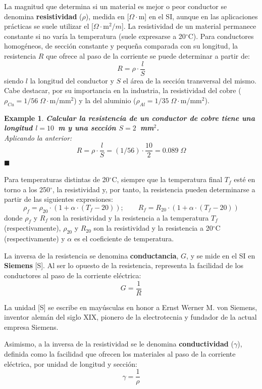 \documentclass[11pt]{book} %
\numberwithin{dummy}{section}
\theoremstyle{ocrenumbox}
\theoremstyle{blacknumex}
\newtheorem{exampleT}{Example}[chapter]
\theoremstyle{blacknumbox}
\theoremstyle{ocrenum}
\newenvironment{example}{\begin{exampleT}}{\hfill{\tiny\ensuremath{\blacksquare}}\end{exampleT}}
\newenvironment{remark}{\par\vspace{10pt}\small %
\begin{list}{}{
\leftmargin=35pt %
\rightmargin=25pt}\item\ignorespaces %
\makebox[-2.5pt]{\begin{tikzpicture}[overlay]
\node[draw=ocre!60,line width=1pt,circle,fill=ocre!25,font=\sffamily\bfseries,inner sep=2pt,outer sep=0pt] at (-15pt,0pt){\textcolor{ocre}{N}};\end{tikzpicture}} %
\advance\baselineskip -1pt}{\end{list}\vskip5pt} %
\newlength\esp
\begin{document}
	La magnitud que determina si un material es mejor o peor conductor se denomina \textbf{resistividad} ($\rho$), medida en [$\Omega\cdot$m] en el SI, aunque en las aplicaciones prácticas se suele utilizar el [$\Omega\cdot$m$^2/m$]. La resistividad de un material permanece constante si no varía la temperatura (suele expresarse a 20$^\circ$C). Para conductores homogéneos, de sección constante y pequeña comparada con su longitud, la resistencia $R$ que ofrece al paso de la corriente se puede determinar a partir de: 
	\begin{equation*}\label{eq.resistencia_rho}
		R=\rho\cdot \dfrac{l}{S}
	\end{equation*}
	siendo $l$ la longitud del conductor y $S$ el área de la sección transversal del mismo. Cabe destacar, por su importancia en la industria, la resistividad del cobre ($\rho_{Cu}=1/56\;\Omega \cdot$m/mm$^2$) y la del aluminio ($\rho_{Al}=1/35\;\Omega \cdot$m/mm$^2$).
	
	\vspace{4mm}
	\begin{example}
		\textbf{Calcular la resistencia de un conductor de cobre tiene una longitud $l=10$~m y una sección $S=2$~mm$^2$.}\\
		Aplicando la anterior: 
		\begin{equation*}
			R=\rho\cdot \dfrac{l}{S}=(1/56)\cdot \dfrac{10}{2}=0.089\;\Omega
		\end{equation*}
	\end{example}
	
	Para temperaturas distintas de 20$^\circ$C, siempre que la temperatura final $T_f$ esté en torno a los 250$^\circ$, la resistividad y, por tanto, la resistencia pueden determinarse a partir de las siguientes expresiones:
	\begin{equation*}
		\rho_f=\rho_{20}\cdot (1+\alpha\cdot (T_f-20)); \qquad
		R_f=R_{20}\cdot (1+\alpha\cdot (T_f-20))
	\end{equation*}
	donde $\rho_f$ y $R_f$ son la resistividad y la resistencia a la temperatura $T_f$ (respectivamente), $\rho_{20}$ y $R_{20}$ son la resistividad y la resistencia a 20$^\circ$C (respectivamente) y $\alpha$ es el coeficiente de temperatura. 
	
	La inversa de la resistencia se denomina \textbf{conductancia}, $G$, y se mide en el SI en \textbf{Siemens} [S]. Al ser lo opuesto de la resistencia, representa la facilidad de los conductores al paso de la corriente eléctrica:
	\begin{equation}
		\boxed{G=\dfrac{1}{R}}
	\end{equation}
	\begin{remark}
		La unidad [S] se escribe en mayúsculas en honor a Ernst Werner M. von Siemens, inventor alemán del siglo XIX, pionero de la electrotecnia y fundador de la actual empresa Siemens.
	\end{remark}
	Asimismo, a la inversa de la resistividad se le denomina \textbf{conductividad} ($\gamma$), definida como la facilidad que ofrecen los materiales al paso de la corriente eléctrica, por unidad de longitud y sección:
	\begin{equation*}
		\gamma=\dfrac{1}{\rho}
	\end{equation*}
	
\end{document}
